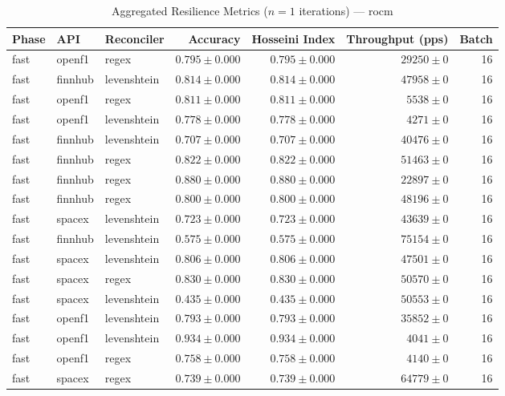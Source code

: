 
\begin{table}[htbp]
\caption{Aggregated Resilience Metrics ($n=1$ iterations) --- rocm}
\begin{tabular}{l l l r r r r}
\hline
Phase & API & Reconciler & Accuracy & Hosseini Index & Throughput (pps) & Batch \\
\hline
fast & openf1 & regex & $0.795\pm0.000$ & $0.795\pm0.000$ & $29250\pm0$ & 16 \\
fast & finnhub & levenshtein & $0.814\pm0.000$ & $0.814\pm0.000$ & $47958\pm0$ & 16 \\
fast & openf1 & regex & $0.811\pm0.000$ & $0.811\pm0.000$ & $5538\pm0$ & 16 \\
fast & openf1 & levenshtein & $0.778\pm0.000$ & $0.778\pm0.000$ & $4271\pm0$ & 16 \\
fast & finnhub & levenshtein & $0.707\pm0.000$ & $0.707\pm0.000$ & $40476\pm0$ & 16 \\
fast & finnhub & regex & $0.822\pm0.000$ & $0.822\pm0.000$ & $51463\pm0$ & 16 \\
fast & finnhub & regex & $0.880\pm0.000$ & $0.880\pm0.000$ & $22897\pm0$ & 16 \\
fast & finnhub & regex & $0.800\pm0.000$ & $0.800\pm0.000$ & $48196\pm0$ & 16 \\
fast & spacex & levenshtein & $0.723\pm0.000$ & $0.723\pm0.000$ & $43639\pm0$ & 16 \\
fast & finnhub & levenshtein & $0.575\pm0.000$ & $0.575\pm0.000$ & $75154\pm0$ & 16 \\
fast & spacex & levenshtein & $0.806\pm0.000$ & $0.806\pm0.000$ & $47501\pm0$ & 16 \\
fast & spacex & regex & $0.830\pm0.000$ & $0.830\pm0.000$ & $50570\pm0$ & 16 \\
fast & spacex & levenshtein & $0.435\pm0.000$ & $0.435\pm0.000$ & $50553\pm0$ & 16 \\
fast & openf1 & levenshtein & $0.793\pm0.000$ & $0.793\pm0.000$ & $35852\pm0$ & 16 \\
fast & openf1 & levenshtein & $0.934\pm0.000$ & $0.934\pm0.000$ & $4041\pm0$ & 16 \\
fast & openf1 & regex & $0.758\pm0.000$ & $0.758\pm0.000$ & $4140\pm0$ & 16 \\
fast & spacex & regex & $0.739\pm0.000$ & $0.739\pm0.000$ & $64779\pm0$ & 16 \\

\end{tabular}
\end{table}
